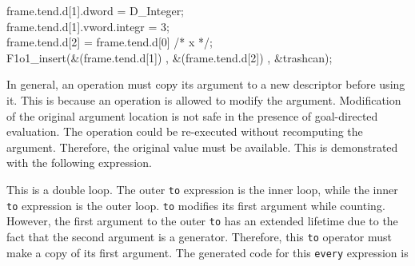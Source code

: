 \goodbreak
\begin{iconcode}
\>frame.tend.d[1].dword = D\_Integer;\\
\>frame.tend.d[1].vword.integr = 3;\\
\>frame.tend.d[2] = frame.tend.d[0] /* x */;\\
\>F1o1\_insert(\&(frame.tend.d[1]) , \&(frame.tend.d[2]) , \&trashcan);\\
\end{iconcode}

In general, an operation must copy its argument to a new descriptor
before using it. This is because an operation is allowed to modify the
argument. Modification of the original argument location is not safe
in the presence of goal-directed evaluation. The operation could be
re-executed without recomputing the argument. Therefore, the original
value must be available. This is demonstrated with the following
expression.


\noindent
This is a double loop. The outer \texttt{to} expression is the inner
loop, while the inner \texttt{to} expression is the outer loop.
\texttt{to} modifies its first argument while counting. However,
the first argument to the outer \texttt{to} has an extended lifetime
due to the fact that the second argument is a generator. Therefore,
this \texttt{to} operator must make a copy of its first argument.  The
generated code for this \texttt{every} expression is

